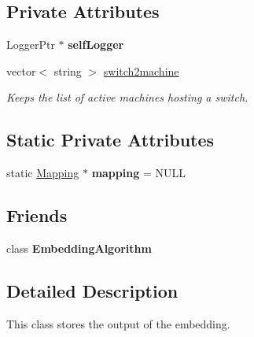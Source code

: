 \subsection*{\-Private \-Attributes}
\begin{DoxyCompactItemize}
\item 
\hypertarget{classMapping_a7459d83cf4c3796caadaf4cc757c7480}{\-Logger\-Ptr $\ast$ {\bfseries self\-Logger}}\label{classMapping_a7459d83cf4c3796caadaf4cc757c7480}

\item 
\hypertarget{classMapping_add485e947cd9b483facf71634bd48f63}{vector$<$ string $>$ \hyperlink{classMapping_add485e947cd9b483facf71634bd48f63}{switch2machine}}\label{classMapping_add485e947cd9b483facf71634bd48f63}

\begin{DoxyCompactList}\small\item\em \-Keeps the list of active machines hosting a switch. \end{DoxyCompactList}\end{DoxyCompactItemize}
\subsection*{\-Static \-Private \-Attributes}
\begin{DoxyCompactItemize}
\item 
\hypertarget{classMapping_aff56d1bc4fd1663684c960295ccc467b}{static \hyperlink{classMapping}{\-Mapping} $\ast$ {\bfseries mapping} = \-N\-U\-L\-L}\label{classMapping_aff56d1bc4fd1663684c960295ccc467b}

\end{DoxyCompactItemize}
\subsection*{\-Friends}
\begin{DoxyCompactItemize}
\item 
\hypertarget{classMapping_af474bc557bdc8f28f24cd9d3d82647af}{class {\bfseries \-Embedding\-Algorithm}}\label{classMapping_af474bc557bdc8f28f24cd9d3d82647af}

\end{DoxyCompactItemize}


\subsection{\-Detailed \-Description}
\-This class stores the output of the embedding. 

